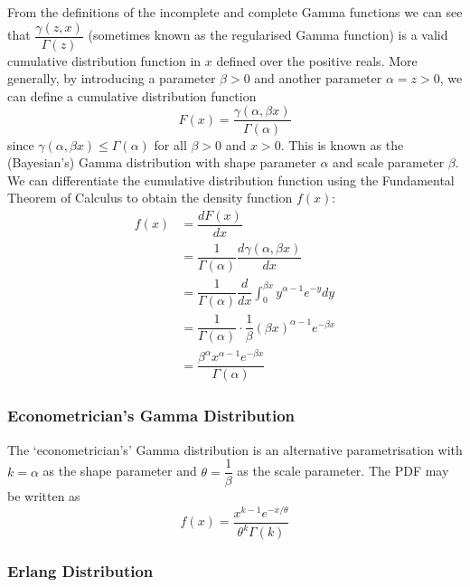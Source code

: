 \documentclass[11pt]{report} %
\begin{document}
From the definitions of the incomplete and complete Gamma functions we can see that $\dfrac{\gamma\left(z, x\right)}{\Gamma\left(z\right)}$ (sometimes known as the regularised Gamma function) is a valid cumulative distribution function in $x$ defined over the positive reals. More generally, by introducing a parameter $\beta >0$ and another parameter $\alpha = z > 0$, we can define a cumulative distribution function
\begin{equation}
F\left(x\right) = \dfrac{\gamma\left(\alpha, \beta x\right)}{\Gamma\left(\alpha\right)}
\end{equation}
since $\gamma\left(\alpha, \beta x\right) \leq \Gamma\left(\alpha\right)$ for all $\beta > 0$ and $x > 0$. This is known as the (Bayesian's) Gamma distribution with shape parameter $\alpha$ and scale parameter $\beta$. We can differentiate the cumulative distribution function using the Fundamental Theorem of Calculus to obtain the density function $f\left(x\right)$:
\begin{align}
f\left(x\right) &= \dfrac{dF\left(x\right)}{dx} \\
&= \dfrac{1}{\Gamma\left(\alpha\right)}\dfrac{d\gamma\left(\alpha, \beta x\right)}{dx} \\
&= \dfrac{1}{\Gamma\left(\alpha\right)}\dfrac{d}{dx}\int_{0}^{\beta x}y^{\alpha - 1}e^{-y}dy \\
&= \dfrac{1}{\Gamma\left(\alpha\right)}\cdot\dfrac{1}{\beta}\left(\beta x\right)^{\alpha - 1}e^{-\beta x} \\
&= \dfrac{\beta^{\alpha}x^{\alpha - 1}e^{-\beta x}}{\Gamma\left(\alpha\right)}
\end{align}

\subsubsection{Econometrician's Gamma Distribution}

The `econometrician's' Gamma distribution is an alternative parametrisation with $k = \alpha$ as the shape parameter and $\theta = \dfrac{1}{\beta}$ as the scale parameter. The PDF may be written as
\begin{equation}
f\left(x\right) = \dfrac{x^{k - 1}e^{-x/\theta}}{\theta^{k}\Gamma\left(k\right)}
\end{equation}

\subsubsection{Erlang Distribution}
\end{document}
